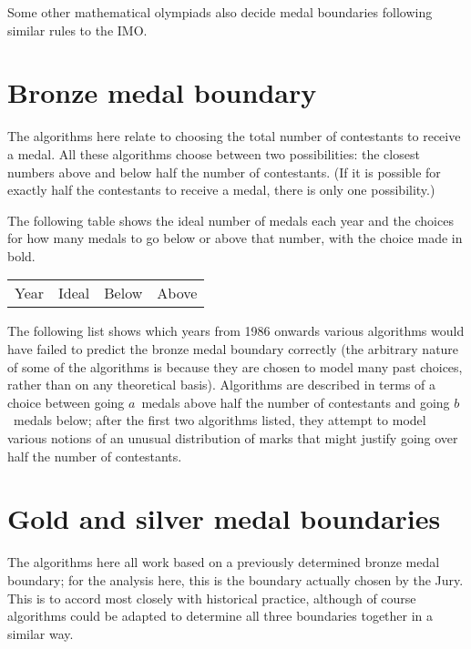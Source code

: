\documentclass[a4paper,11pt]{article}
\begin{document}
Some other mathematical olympiads also decide medal boundaries
following similar rules to the IMO.

\section*{Bronze medal boundary}

The algorithms here relate to choosing the total number of contestants
to receive a medal.  All these algorithms choose between two
possibilities: the closest numbers above and below half the number of
contestants.  (If it is possible for exactly half the contestants to
receive a medal, there is only one possibility.)

The following table shows the ideal number of medals each year and the
choices for how many medals to go below or above that number, with the
choice made in bold.

\begin{tabular}{cccc}
Year & Ideal & Below & Above \\

\end{tabular}

The following list shows which years from 1986 onwards
various algorithms would have failed to predict the
bronze medal boundary correctly (the arbitrary nature of some of the
algorithms is because they are chosen to model many past choices,
rather than on any theoretical basis).  Algorithms are described in
terms of a choice between going $a$~medals above half the number of
contestants and going $b$~medals below; after the first two algorithms
listed, they attempt to model various notions of an unusual
distribution of marks that might justify going over half the number of
contestants.

\begin{itemize}

\end{itemize}

\section*{Gold and silver medal boundaries}

The algorithms here all work based on a previously determined bronze
medal boundary; for the analysis here, this is the boundary actually
chosen by the Jury.  This is to accord most closely with historical
practice, although of course algorithms could be adapted to determine
all three boundaries together in a similar way.
\end{document}
